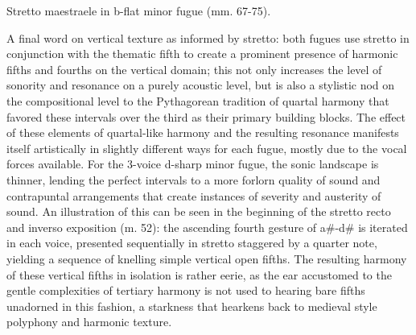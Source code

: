 \begin{Example}[H]
\vspace{1.5em}
    \centering
    \caption{ Stretto maestraele in b-flat minor fugue (mm. 67-75). }
\end{Example}    
    A final word on vertical texture as informed by stretto: both fugues use
stretto in conjunction with the thematic fifth to create a prominent
presence of harmonic fifths and fourths on the vertical domain; this not
only increases the level of sonority and resonance on a purely acoustic
level, but is also a stylistic nod on the compositional level to the
Pythagorean tradition of quartal harmony that favored these intervals
over the third as their primary building blocks. The effect of these
elements of quartal-like harmony and the resulting resonance manifests
itself artistically in slightly different ways for each fugue, mostly
due to the vocal forces available. For the 3-voice d-sharp minor fugue,
the sonic landscape is thinner, lending the perfect intervals to a more
forlorn quality of sound and contrapuntal arrangements that create
instances of severity and austerity of sound. An illustration of this
can be seen in the beginning of the stretto recto and inverso exposition
(m. 52): the ascending fourth gesture of a\#-d\# is iterated in each
voice, presented sequentially in stretto staggered by a quarter note,
yielding a sequence of knelling simple vertical open fifths. The
resulting harmony of these vertical fifths in isolation is rather eerie,
as the ear accustomed to the gentle complexities of tertiary harmony is
not used to hearing bare fifths unadorned in this fashion, a starkness
that hearkens back to medieval style polyphony and harmonic texture.



